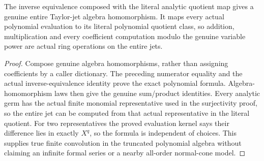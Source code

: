 \begin{theorem}
\label{hir:relative-normal-polynomial-jets-true-multiplicative-truncation}
\leanok
{}
The inverse equivalence composed with the literal analytic quotient map gives a genuine entire Taylor-jet algebra homomorphism. It maps every actual polynomial evaluation to its literal polynomial quotient class, so addition, multiplication and every coefficient computation modulo the genuine variable power are actual ring operations on the entire jets.
\end{theorem}
\begin{proof}
Compose genuine algebra homomorphisms, rather than assigning coefficients by a caller dictionary. The preceding numerator equality and the actual inverse-equivalence identity prove the exact polynomial formula. Algebra-homomorphism laws then give the genuine sum/product identities. Every analytic germ has the actual finite monomial representative used in the surjectivity proof, so the entire jet can be computed from that actual representative in the literal quotient. For two representatives the proved evaluation kernel says their difference lies in exactly $X^q$, so the formula is independent of choices. This supplies true finite convolution in the truncated polynomial algebra without claiming an infinite formal series or a nearby all-order normal-cone model.
\end{proof}

